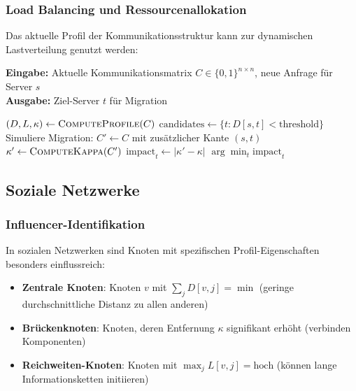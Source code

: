 ﻿\documentclass[a4paper,12pt]{article}
\theoremstyle{definition}
\begin{document}
	\subsubsection{Load Balancing und Ressourcenallokation}
	
	Das aktuelle Profil der Kommunikationsstruktur kann zur dynamischen Lastverteilung genutzt werden:
	
	\begin{algorithm}[H]
		\caption{Profilbasiertes Load Balancing}
		\label{alg:loadbalancing}
		\textbf{Eingabe:} Aktuelle Kommunikationsmatrix $C \in \{0,1\}^{n \times n}$, neue Anfrage für Server $s$ \\
		\textbf{Ausgabe:} Ziel-Server $t$ für Migration
		\begin{algorithmic}[1]
			\State $(D, L, \kappa) \gets \textsc{ComputeProfile}(C)$
			\State $\text{candidates} \gets \{t : D[s,t] < \text{threshold}\}$ 
			\State Simuliere Migration: $C' \gets C$ mit zusätzlicher Kante $(s,t)$
			\State $\kappa' \gets \textsc{ComputeKappa}(C')$
			\State $\text{impact}_t \gets |\kappa' - \kappa|$ 
			\EndFor
			\State \Return $\arg\min_t \text{impact}_t$ 
		\end{algorithmic}
	\end{algorithm}
	
	\subsection{Soziale Netzwerke}
	
	\subsubsection{Influencer-Identifikation}
	
	In sozialen Netzwerken sind Knoten mit spezifischen Profil-Eigenschaften besonders einflussreich:
	
	\begin{itemize}
		\item[-] \textbf{Zentrale Knoten}: Knoten $v$ mit $\sum_j D[v,j] = \min$ (geringe durchschnittliche Distanz zu allen anderen)
		\item[-] \textbf{Brückenknoten}: Knoten, deren Entfernung $\kappa$ signifikant erhöht (verbinden Komponenten)
		\item[-] \textbf{Reichweiten-Knoten}: Knoten mit $\max_j L[v,j] = \text{hoch}$ (können lange Informationsketten initiieren)
	\end{itemize}
	
\end{document}
